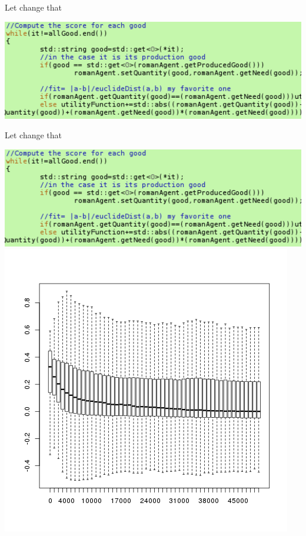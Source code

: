 \documentclass[8pt, handout=show,notes=show]{beamer}
\begin{document}
\begin{frame}{Let change that}
	\begin{center}

		\includegraphics[width=1\textwidth]{./codeNeeds.png}\\
	\end{center}
\end{frame}
\begin{frame}{Let change that}
	\begin{center}

		\includegraphics[width=1\textwidth]{./codeNeeds.png}\\
		\includegraphics[width=.5\textwidth]{./NonEquilibrium.png}
	\end{center}
\end{frame}
\end{document}
